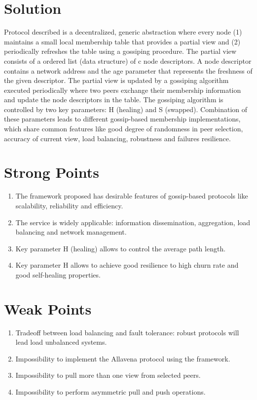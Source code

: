 \documentclass[10pt]{proc}
\begin{document}
\section{Solution}
Protocol described is a decentralized, generic abstraction where every node (1) maintains a small local membership table that provides a partial view and (2) periodically refreshes the table using a gossiping procedure. The partial view consists of a ordered list (data structure) of c node descriptors. A node descriptor contains a network address and the age parameter that represents the freshness of the given descriptor. The partial view is updated by a gossiping algorithm executed periodically where two peers exchange their membership information and update the node descriptors in the table. The gossiping algorithm is controlled by two key parameters: H (healing) and S (swapped). Combination of these parameters leads to different gossip-based membership implementations, which share common features like good degree of randomness in peer selection, accuracy of current view, load balancing, robustness and failures resilience. 

\section{Strong Points}
\begin{enumerate}
\item The framework proposed has desirable features of gossip-based protocols like scalability, reliability and efficiency. 
\item The service is widely applicable: information dissemination, aggregation, load balancing and network management. 
\item Key parameter H (healing) allows to control the average path length.
\item Key parameter H allows to achieve good resilience to high churn rate and good self-healing properties.
\end{enumerate}

\section{Weak Points}
\begin{enumerate}
 \item Tradeoff between load balancing and fault tolerance: robust protocols will lead load unbalanced systems. 
\item Impossibility to implement the Allavena protocol using the framework. 
\item Impossibility to pull more than one view from selected peers. 
\item Impossibility to perform asymmetric pull and push operations. 
\end{enumerate}
\end{document}
